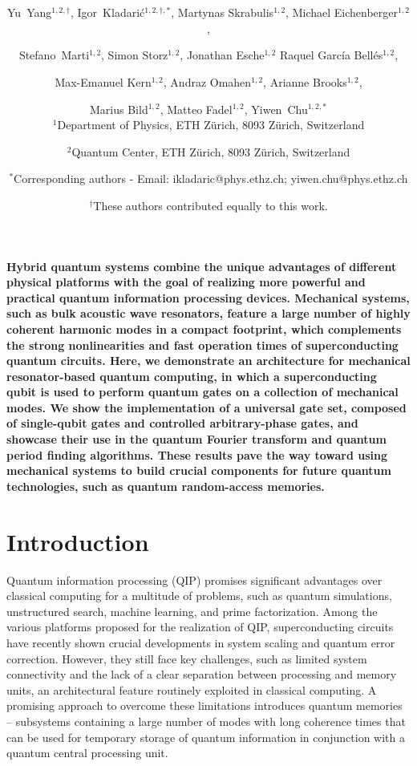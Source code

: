 \documentclass[12pt]{article}
\date{}
\title{\bfseries \boldmath \scititle}
\author{

	Yu~Yang$^{1,2,\dagger}$,
	Igor~Kladarić$^{1,2,\dagger,*}$,
	Martynas Skrabulis$^{1,2}$,
    Michael Eichenberger$^{1,2}$,\and
    Stefano~Marti$^{1,2}$,
    Simon Storz$^{1,2}$,
    Jonathan Esche$^{1,2}$
    Raquel García Bellés$^{1,2}$,\and
    Max-Emanuel Kern$^{1,2}$,
    Andraz Omahen$^{1,2}$,
    Arianne Brooks$^{1,2}$,\and
    Marius Bild$^{1,2}$,
    Matteo Fadel$^{1,2}$,
    Yiwen~Chu$^{1,2,*}$
\\


	\small$^{1}$Department of Physics, ETH Zürich, 8093 Zürich, Switzerland\and
    \small$^{2}$Quantum Center, ETH Zürich, 8093 Zürich, Switzerland\and

	\small$^\ast$Corresponding authors -  Email: ikladaric@phys.ethz.ch; yiwen.chu@phys.ethz.ch\and

	\small$^\dagger$These authors contributed equally to this work.
}
\renewenvironment{abstract}
	{\quotation}
	{\endquotation}
\begin{document}
\maketitle
\begin{abstract} \bfseries \boldmath
Hybrid quantum systems combine the unique advantages of different physical platforms with the goal of realizing more powerful and practical quantum information processing devices.
Mechanical systems, such as bulk acoustic wave resonators, feature a large number of highly coherent harmonic modes in a compact footprint, which complements the strong nonlinearities and fast operation times of superconducting quantum circuits. Here, we demonstrate an architecture for mechanical resonator-based quantum computing, in which a superconducting qubit is used to perform quantum gates on a collection of mechanical modes. We show the implementation of a universal gate set, composed of single-qubit gates and controlled arbitrary-phase gates, and showcase their use in the quantum Fourier transform and quantum period finding algorithms. These results pave the way toward using mechanical systems to build crucial components for future quantum technologies, such as quantum random-access memories.

\end{abstract}
\maketitle

\section*{Introduction}
Quantum information processing (QIP) promises significant advantages over classical computing for a multitude of problems, such as quantum simulations\cite{feynman2018simulating, lloyd1996universal}, unstructured search\cite{grover1996fast}, machine learning\cite{biamonte2017quantum}, and prime factorization\cite{shor1999polynomial, lucero2012computing}. Among the various platforms proposed for the realization of QIP, superconducting circuits have recently shown crucial developments in system scaling and quantum error correction\cite{kim2023evidence, google2025quantum}. However, they still face key challenges, such as limited system connectivity and the lack of a clear separation between processing and memory units, an architectural feature routinely exploited in classical computing\cite{kjaergaard2020superconducting}. A promising approach to overcome these limitations introduces quantum memories -- subsystems containing a large number of modes with long coherence times that can be used for temporary storage of quantum information in conjunction with a quantum central processing unit.
\end{document}

